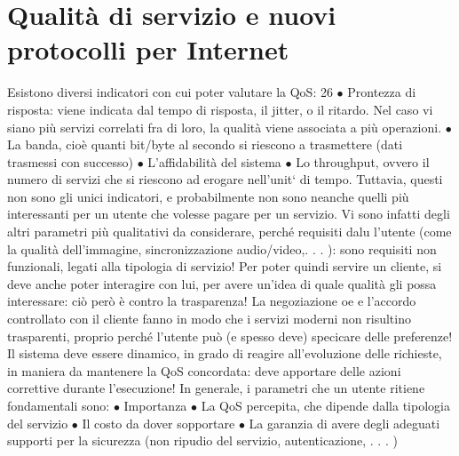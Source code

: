 
\section{Qualità di servizio e nuovi protocolli per Internet}
Esistono diversi indicatori con cui poter valutare la QoS:
26
$\bullet$ Prontezza di risposta: viene indicata dal tempo di risposta, il jitter, o il
ritardo. Nel caso vi siano più servizi correlati fra di loro, la qualità viene
associata a più operazioni.
$\bullet$ La banda, cioè quanti bit/byte al secondo si riescono a trasmettere (dati
trasmessi con successo)
$\bullet$ L'affidabilità del sistema
$\bullet$ Lo throughput, ovvero il numero di servizi che si riescono ad erogare
nell'unit` di tempo.
Tuttavia, questi non sono gli unici indicatori, e probabilmente non sono neanche
quelli più interessanti per un utente che volesse pagare per un servizio. Vi sono
infatti degli altri parametri più qualitativi da considerare, perché requisiti dalu
l'utente (come la qualità dell'immagine, sincronizzazione audio/video,. . . ): sono
requisiti non funzionali, legati alla tipologia di servizio! Per poter quindi servire
un cliente, si deve anche poter interagire con lui, per avere un'idea di quale
qualità gli possa interessare: ciò però è contro la trasparenza! La negoziazione
oe
e l'accordo controllato con il cliente fanno in modo che i servizi moderni non
risultino trasparenti, proprio perché l'utente può (e spesso deve) specicare delle
preferenze! Il sistema deve essere dinamico, in grado di reagire all'evoluzione
delle richieste, in maniera da mantenere la QoS concordata: deve apportare
delle azioni correttive durante l'esecuzione! In generale, i parametri che un
utente ritiene fondamentali sono:
$\bullet$ Importanza
$\bullet$ La QoS percepita, che dipende dalla tipologia del servizio
$\bullet$ Il costo da dover sopportare
$\bullet$ La garanzia di avere degli adeguati supporti per la sicurezza (non ripudio
del servizio, autenticazione, . . . )

